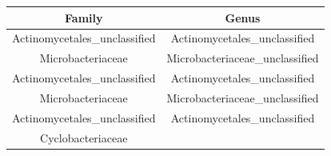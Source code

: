 \documentclass[]{article}
\begin{document}
\begin{longtable}[]{@{}cc@{}}
\toprule
\begin{minipage}[b]{0.41\columnwidth}\centering\strut
Family\strut
\end{minipage} & \begin{minipage}[b]{0.43\columnwidth}\centering\strut
Genus\strut
\end{minipage}\tabularnewline
\midrule
\endhead
\begin{minipage}[t]{0.41\columnwidth}\centering\strut
Actinomycetales\_unclassified\strut
\end{minipage} & \begin{minipage}[t]{0.43\columnwidth}\centering\strut
Actinomycetales\_unclassified\strut
\end{minipage}\tabularnewline
\begin{minipage}[t]{0.41\columnwidth}\centering\strut
Microbacteriaceae\strut
\end{minipage} & \begin{minipage}[t]{0.43\columnwidth}\centering\strut
Microbacteriaceae\_unclassified\strut
\end{minipage}\tabularnewline
\begin{minipage}[t]{0.41\columnwidth}\centering\strut
Actinomycetales\_unclassified\strut
\end{minipage} & \begin{minipage}[t]{0.43\columnwidth}\centering\strut
Actinomycetales\_unclassified\strut
\end{minipage}\tabularnewline
\begin{minipage}[t]{0.41\columnwidth}\centering\strut
Microbacteriaceae\strut
\end{minipage} & \begin{minipage}[t]{0.43\columnwidth}\centering\strut
Microbacteriaceae\_unclassified\strut
\end{minipage}\tabularnewline
\begin{minipage}[t]{0.41\columnwidth}\centering\strut
Actinomycetales\_unclassified\strut
\end{minipage} & \begin{minipage}[t]{0.43\columnwidth}\centering\strut
Actinomycetales\_unclassified\strut
\end{minipage}\tabularnewline
\begin{minipage}[t]{0.41\columnwidth}\centering\strut
Cyclobacteriaceae\strut
\end{minipage} & \begin{minipage}[t]{0.43\columnwidth}\centering\strut

\end{minipage}
\end{longtable}
\end{document}
